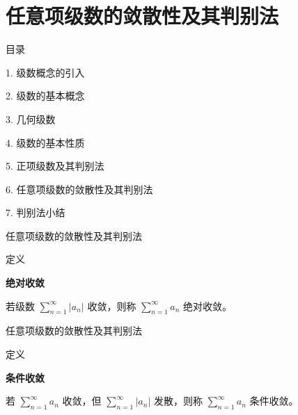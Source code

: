 \documentclass[aspectratio=169,10pt,fontset=fandol]{ctexbeamer}
\begin{document}
\section{任意项级数的敛散性及其判别法}
\begin{frame}[t,fragile]{目录}
\normalsize
{\color{black}\normalsize 1. 级数概念的引入\par}\vspace{0.22em}
{\color{black}\normalsize 2. 级数的基本概念\par}\vspace{0.22em}
{\color{black}\normalsize 3. 几何级数\par}\vspace{0.22em}
{\color{black}\normalsize 4. 级数的基本性质\par}\vspace{0.22em}
{\color{black}\normalsize 5. 正项级数及其判别法\par}\vspace{0.22em}
{\color{blue}\normalsize 6. 任意项级数的敛散性及其判别法\par}\vspace{0.22em}
{\color{gray!40}\normalsize 7. 判别法小结\par}\vspace{0.22em}
\end{frame}
\begin{frame}[t,fragile]{任意项级数的敛散性及其判别法}
\normalsize
\begin{block}{定义}
{\normalsize
\textbf{绝对收敛}\par

	若级数 \(\sum\limits_{n = 1}^{  \infty } |a_n|\) 收敛，则称 \(\sum\limits_{n = 1}^{  \infty } a_n\) 绝对收敛。

}
\end{block}
\end{frame}
\begin{frame}[t,fragile]{任意项级数的敛散性及其判别法}
\normalsize
\begin{block}{定义}
{\normalsize
\textbf{条件收敛}\par

	若 \(\sum\limits_{n = 1}^{  \infty } a_n\) 收敛，但 \(\sum\limits_{n = 1}^{  \infty } |a_n|\) 发散，则称 \(\sum\limits_{n = 1}^{  \infty } a_n\) 条件收敛。

}
\end{block}
\end{frame}
\end{document}
